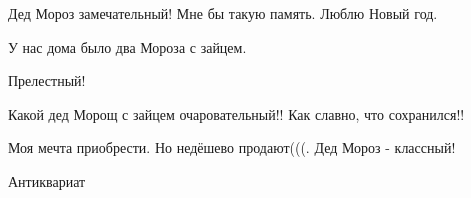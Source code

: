  
 
 
 
 


Дед Мороз замечательный! Мне бы такую память. Люблю Новый год.


У нас дома было два Мороза с зайцем.

Прелестный!

Какой дед Морощ с зайцем очаровательный!! Как славно, что сохранился!!

Моя мечта приобрести. Но недёшево продают(((. Дед Мороз - классный!

Антиквариат

